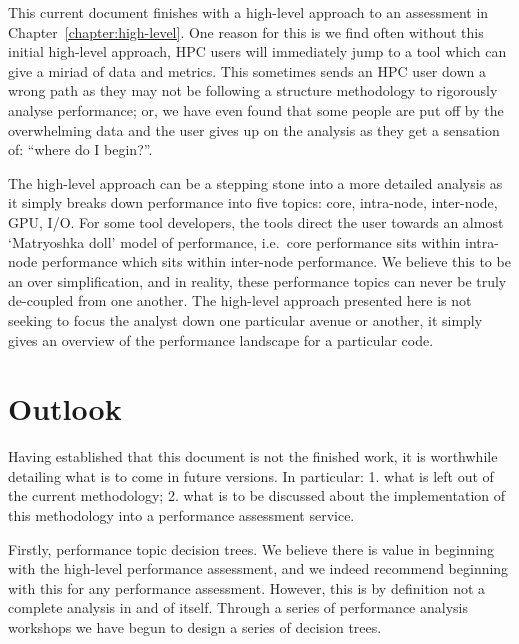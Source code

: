 This current document finishes with a high-level approach to an assessment in Chapter~\ref{chapter:high-level}. One reason for this is we find often without this initial high-level approach, HPC users will immediately jump to a tool which can give a miriad of data and metrics. This sometimes sends an HPC user down a wrong path as they may not be following a structure methodology to rigorously analyse performance; or, we have even found that some people are put off by the overwhelming data and the user gives up on the analysis as they get a sensation of: ``where do I begin?''. 

The high-level approach can be a stepping stone into a more detailed analysis as it simply  breaks down performance into five topics: core, intra-node, inter-node, GPU, I/O. For some tool developers, the tools direct the user towards an almost `Matryoshka doll' model of performance, i.e.~core performance sits within intra-node performance which sits within inter-node performance. We believe this to be an over simplification, and in reality, these performance topics can never be truly de-coupled from one another. The high-level approach presented here is not seeking to focus the analyst down one particular avenue or another, it simply gives an overview of the performance landscape for a particular code. 


\section{Outlook}
Having established that this document is not the finished work, it is worthwhile detailing what is to come in future versions. In particular: 1. what is left out of the current methodology; 2. what is to be discussed about the implementation of this methodology into a performance assessment service.

Firstly, performance topic decision trees. We believe there is value in beginning with the high-level performance assessment, and we indeed recommend beginning with this for any performance assessment. However, this is by definition not a complete analysis in and of itself. Through a series of performance analysis workshops we have begun to design a series of decision trees. 

